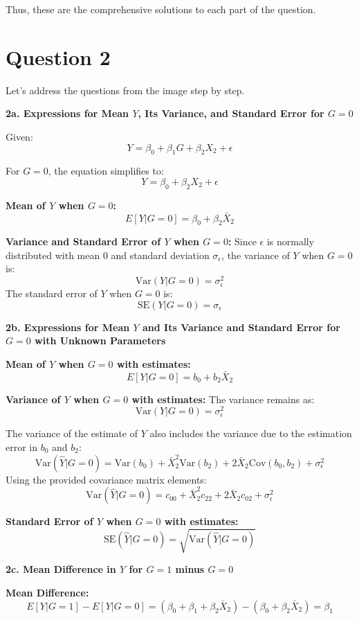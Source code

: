 \documentclass{article}
\begin{document}
Thus, these are the comprehensive solutions to each part of the question.

\section{Question 2}

Let's address the questions from the image step by step.

\textbf{2a. Expressions for Mean \(Y\), Its Variance, and Standard Error for \(G=0\)}

Given:
\[ Y = \beta_0 + \beta_1 G + \beta_2 X_2 + \epsilon \]

For \(G = 0\), the equation simplifies to:
\[ Y = \beta_0 + \beta_2 X_2 + \epsilon \]

\textbf{Mean of \(Y\) when \(G=0\):}
\[ E[Y | G=0] = \beta_0 + \beta_2 \bar{X}_2 \]

\textbf{Variance and Standard Error of \(Y\) when \(G=0\):}
Since \(\epsilon\) is normally distributed with mean 0 and standard deviation \(\sigma_\epsilon\), the variance of \(Y\) when \(G=0\) is:
\[ \text{Var}(Y | G=0) = \sigma_\epsilon^2 \]
The standard error of \(Y\) when \(G=0\) is:
\[ \text{SE}(Y | G=0) = \sigma_\epsilon \]

\textbf{2b. Expressions for Mean \(Y\) and Its Variance and Standard Error for \(G=0\) with Unknown Parameters}

\textbf{Mean of \(Y\) when \(G=0\) with estimates:}
\[ E[Y | G=0] = b_0 + b_2 \bar{X}_2 \]

\textbf{Variance of \(Y\) when \(G=0\) with estimates:}
The variance remains as:
\[ \text{Var}(Y | G=0) = \sigma_\epsilon^2 \]

The variance of the estimate of \(Y\) also includes the variance due to the estimation error in \(b_0\) and \(b_2\):
\[ \text{Var}(\hat{Y} | G=0) = \text{Var}(b_0) + \bar{X}_2^2 \text{Var}(b_2) + 2 \bar{X}_2 \text{Cov}(b_0, b_2) + \sigma_\epsilon^2 \]
Using the provided covariance matrix elements:
\[ \text{Var}(\hat{Y} | G=0) = c_{00} + \bar{X}_2^2 c_{22} + 2 \bar{X}_2 c_{02} + \sigma_\epsilon^2 \]

\textbf{Standard Error of \(Y\) when \(G=0\) with estimates:}
\[ \text{SE}(\hat{Y} | G=0) = \sqrt{\text{Var}(\hat{Y} | G=0)} \]

\textbf{2c. Mean Difference in \(Y\) for \(G=1\) minus \(G=0\)}

\textbf{Mean Difference:}
\[ E[Y | G=1] - E[Y | G=0] = (\beta_0 + \beta_1 + \beta_2 \bar{X}_2) - (\beta_0 + \beta_2 \bar{X}_2) = \beta_1 \]
\end{document}
